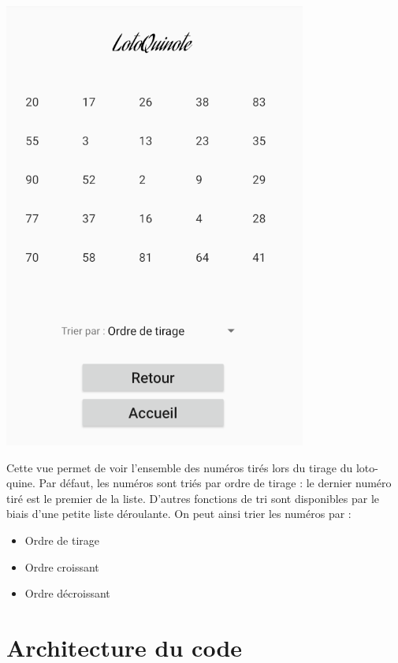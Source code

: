 \documentclass{article}
\begin{document}
    \begin{minipage}{.35\textwidth}%
        \includegraphics[scale=0.6]{liste.png}
    \end{minipage}%
    \hfill
    \begin{minipage}{.6\textwidth}%
    Cette vue permet de voir l'ensemble des numéros tirés lors du tirage du loto-quine. Par défaut, les numéros sont triés par ordre de tirage : le dernier numéro tiré est le premier de la liste.
    \vspace{1em}
    \newline
    D'autres fonctions de tri sont disponibles par le biais d'une petite liste déroulante. On peut ainsi trier les numéros par :
    \begin{itemize}
        \item Ordre de tirage
        \item Ordre croissant
        \item Ordre décroissant
    \end{itemize}
    \end{minipage}%
    
    
    


\section{Architecture du code}
\end{document}
